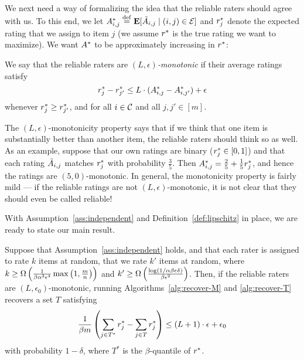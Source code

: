 We next need a way of formalizing the idea that the reliable raters should 
agree with us. To this end, we let 
$A^*_{i,j} \stackrel{\rm def}{=} \mathbf{E}[\tilde{A}_{i,j} \mid (i,j) \in \mathcal{E}]$ and $r^*_j$ denote the expected 
rating that we assign to item $j$ (we assume $r^*$ is the true rating we want to maximize).
We want $A^*$ to be approximately increasing in $r^*$:
\begin{definition}
\label{def:lipschitz}
We say that the reliable raters are \emph{$(L,\epsilon)$-monotonic} if their 
average ratings satisfy
\begin{equation}
\label{eq:lipschitz}
r^*_j - r^*_{j'} \leq L \cdot (A^*_{i,j} - A^*_{i,j'}) + \epsilon
\end{equation}
whenever $r^*_j \geq r^*_{j'}$, and
for all $i \in \mathcal{C}$ and all $j,j' \in [m]$.
\end{definition}
The $(L,\epsilon)$-monotonicity property says that if we think that one item is 
substantially better than another item, the reliable raters should think 
so as well. As an example, suppose that our own ratings are binary 
($r^*_j \in [0,1]$) and that each rating $\tilde{A}_{i,j}$ matches $r^*_j$ 
with probability $\frac{3}{5}$. Then 
$A^*_{i,j} = \frac{2}{5} + \frac{1}{5}r^*_j$, 
and hence the ratings are $(5,0)$-monotonic. 
In general, the monotonicity property is fairly mild --- if the reliable ratings 
are not $(L,\epsilon)$-monotonic, it is not clear that they should 
even be called reliable!

With Assumption~\ref{ass:independent} and Definition~\ref{def:lipschitz} 
in place, we are ready to state our main result. 

\begin{theorem}
\label{thm:main}
Suppose that Assumption~\ref{ass:independent} holds, and that each rater is 
assigned to rate $k$ items at random, that we rate $k'$ items at random, 
where $k \geq \Omega\left( \frac{1}{\beta\alpha^3\epsilon^4}\max\left( 1, \frac{m}{n} \right) \right)$ 
and $k' \geq \Omega\left( \frac{\log(1/\alpha\beta\epsilon\delta)}{\beta\epsilon^2} \right)$.
Then, if the reliable raters are $(L,\epsilon_0)$-monotonic, running 
Algorithms~\ref{alg:recover-M} and \ref{alg:recover-T} recovers a set 
$T$ satisfying 
\[ \frac{1}{\beta m} \left( \sum_{j \in T^*} r^*_j - \sum_{j \in T} r^*_j \right) 
\leq (L+1) \cdot \epsilon + \epsilon_0 \]
with probability $1-\delta$, where $T^*$ is the $\beta$-quantile of $r^*$.
\end{theorem}

